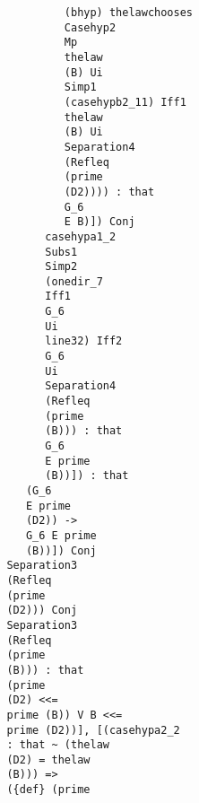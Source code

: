 \documentclass[12pt]{article}
\begin{document}
\begin{verbatim}
                                           (bhyp) thelawchooses 
                                           Casehyp2 
                                           Mp 
                                           thelaw 
                                           (B) Ui 
                                           Simp1 
                                           (casehypb2_11) Iff1 
                                           thelaw 
                                           (B) Ui 
                                           Separation4 
                                           (Refleq 
                                           (prime 
                                           (D2)))) : that 
                                           G_6 
                                           E B)]) Conj 
                                        casehypa1_2 
                                        Subs1 
                                        Simp2 
                                        (onedir_7 
                                        Iff1 
                                        G_6 
                                        Ui 
                                        line32) Iff2 
                                        G_6 
                                        Ui 
                                        Separation4 
                                        (Refleq 
                                        (prime 
                                        (B))) : that 
                                        G_6 
                                        E prime 
                                        (B))]) : that 
                                     (G_6 
                                     E prime 
                                     (D2)) -> 
                                     G_6 E prime 
                                     (B))]) Conj 
                                  Separation3 
                                  (Refleq 
                                  (prime 
                                  (D2))) Conj 
                                  Separation3 
                                  (Refleq 
                                  (prime 
                                  (B))) : that 
                                  (prime 
                                  (D2) <<= 
                                  prime (B)) V B <<= 
                                  prime (D2))], [(casehypa2_2 
                                  : that ~ (thelaw 
                                  (D2) = thelaw 
                                  (B))) => 
                                  ({def} (prime 

\end{verbatim}
\end{document}
